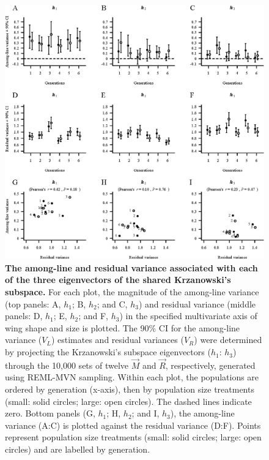 \begin{figure}[htp]
\includegraphics[width=1\textwidth]{Chp3_Multi/HvecsThruMnR.eps}
\vspace*{-0.4cm}
\caption[The among-line and residual variance associated with each of the three eigenvectors of the shared Krzanowski’s subspace.]{\textbf{The among-line and residual variance associated with each of the three eigenvectors of the shared Krzanowski’s subspace.} For each plot, the magnitude of the among-line variance (top panels: A, $h_1$; B, $h_2$; and C, $h_3$) and residual variance (middle panels: D, $h_1$; E, $h_2$; and F, $h_3$) in the specified multivariate axis of wing shape and size is plotted. The 90\% CI for the among-line variance ($V_L$) estimates and residual variances ($V_R$) were determined by projecting the Krzanowski’s subspace eigenvectors ($h_1$: $h_3$) through the 10,000 sets of twelve $\vec{M}$ and $\vec{R}$, respectively, generated using REML-MVN sampling. Within each plot, the populations are ordered by generation (x-axis), then by population size treatments (small: solid circles; large: open circles). The dashed lines indicate zero. Bottom panels (G, $h_1$; H, $h_2$; and I, $h_3$), the among-line variance (A:C) is plotted against the residual variance (D:F). Points represent population size treatments (small: solid circles; large: open circles) and are labelled by generation.}
\label{fig:multi_HvecsThruMnR}
\end{figure}
\FloatBarrier

